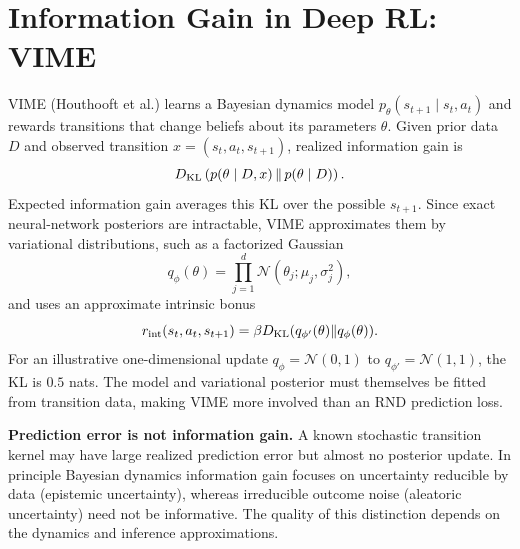 \section{Information Gain in Deep RL: VIME}
VIME (Houthooft et al.) learns a Bayesian dynamics model $p_\theta(s_{t+1}\mid s_t,a_t)$ and rewards transitions that change beliefs about its parameters $\theta$. Given prior data $D$ and observed transition $x=(s_t,a_t,s_{t+1})$, realized information gain is
\[
D_{\rm KL}\left(p(\theta\mid D,x)\,\|\,p(\theta\mid D)\right).
\]
Expected information gain averages this KL over the possible $s_{t+1}$. Since exact neural-network posteriors are intractable, VIME approximates them by variational distributions, such as a factorized Gaussian
\[
q_\phi(\theta)=\prod_{j=1}^{d}\mathcal N(\theta_j;\mu_j,\sigma_j^2),
\]
and uses an approximate intrinsic bonus
\[
r_{\rm int}(s_t,a_t,s_{t+1})=
\beta D_{\rm KL}(q_{\phi'}(\theta)\|q_\phi(\theta)).
\]
For an illustrative one-dimensional update $q_\phi=\mathcal N(0,1)$ to $q_{\phi'}=\mathcal N(1,1)$, the KL is $0.5$ nats. The model and variational posterior must themselves be fitted from transition data, making VIME more involved than an RND prediction loss.

\begin{pitfall}
\textbf{Prediction error is not information gain.} A known stochastic transition kernel may have large realized prediction error but almost no posterior update. In principle Bayesian dynamics information gain focuses on uncertainty reducible by data (epistemic uncertainty), whereas irreducible outcome noise (aleatoric uncertainty) need not be informative. The quality of this distinction depends on the dynamics and inference approximations.
\end{pitfall}

